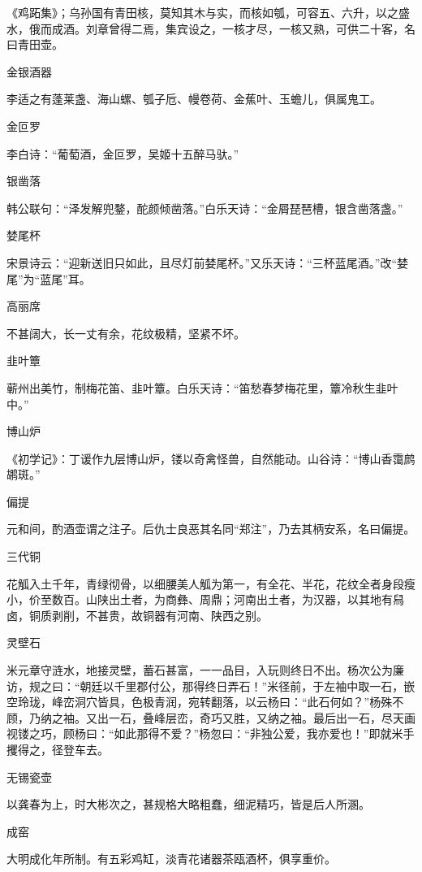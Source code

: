 \documentclass[a4paper,12pt,UTF8,twoside]{ctexbook}
\begin{document}
    《鸡跖集》；乌孙国有青田核，莫知其木与实，而核如瓠，可容五、六升，以之盛水，俄而成酒。刘章曾得二焉，集宾设之，一核才尽，一核又熟，可供二十客，名曰青田壶。
    
    金银酒器
    
    李适之有蓬莱盏、海山螺、瓠子卮、幔卷荷、金蕉叶、玉蟾儿，俱属鬼工。
    
    金叵罗
    
    李白诗：“葡萄酒，金叵罗，吴姬十五醉马驮。”
    
    银凿落
    
    韩公联句：“泽发解兜鍪，酡颜倾凿落。”白乐天诗：“金屑琵琶槽，银含凿落盏。”
    
    婪尾杯
    
    宋景诗云：“迎新送旧只如此，且尽灯前婪尾杯。”又乐天诗：“三杯蓝尾酒。”改“婪尾”为“蓝尾”耳。
    
    高丽席
    
    不甚阔大，长一丈有余，花纹极精，坚紧不坏。
    
    韭叶簟
    
    蕲州出美竹，制梅花笛、韭叶簟。白乐天诗：“笛愁春梦梅花里，簟冷秋生韭叶中。”
    
    博山炉
    
    《初学记》：丁谖作九层博山炉，镂以奇禽怪兽，自然能动。山谷诗：“博山香霭鹧鹕斑。”
    
    偏提
    
    元和间，酌酒壶谓之注子。后仇士良恶其名同“郑注”，乃去其柄安系，名曰偏提。
    
    三代铜
    
    花觚入土千年，青绿彻骨，以细腰美人觚为第一，有全花、半花，花纹全者身段瘦小，价至数百。山陕出土者，为商彝、周鼎；河南出土者，为汉器，以其地有舄卤，铜质剥削，不甚贵，故铜器有河南、陕西之别。
    
    灵壁石
    
    米元章守涟水，地接灵壁，蓄石甚富，一一品目，入玩则终日不出。杨次公为廉访，规之曰：“朝廷以千里郡付公，那得终日弄石！”米径前，于左袖中取一石，嵌空玲珑，峰峦洞穴皆具，色极青润，宛转翻落，以云杨曰：“此石何如？”杨殊不顾，乃纳之袖。又出一石，叠峰层峦，奇巧又胜，又纳之袖。最后出一石，尽天画视镂之巧，顾杨曰：“如此那得不爱？”杨忽曰：“非独公爱，我亦爱也！”即就米手攫得之，径登车去。
    
    无锡瓷壶
    
    以龚春为上，时大彬次之，甚规格大略粗蠢，细泥精巧，皆是后人所溷。
    
    成窑
    
    大明成化年所制。有五彩鸡缸，淡青花诸器茶瓯酒杯，俱享重价。
    
\end{document}
